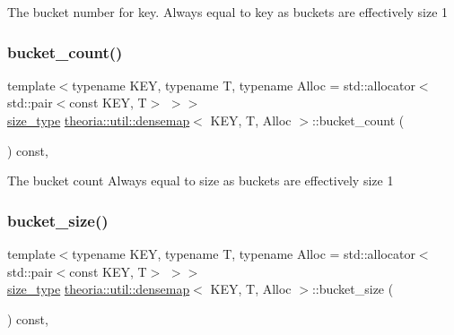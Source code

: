 The bucket number for key. Always equal to key as buckets are effectively size 1 \mbox{\label{classtheoria_1_1util_1_1densemap_acb06213b8d862b1295c79752a2329fd6}} 
\subsubsection{\texorpdfstring{bucket\+\_\+count()}{bucket\_count()}}
{\footnotesize\ttfamily template$<$typename K\+EY, typename T, typename Alloc = std\+::allocator$<$std\+::pair$<$const K\+E\+Y, T$>$ $>$$>$ \\
\hyperlink{classtheoria_1_1util_1_1densemap_a133075e61db44e086c734c8a32ca6ab2}{size\+\_\+type} \hyperlink{classtheoria_1_1util_1_1densemap}{theoria\+::util\+::densemap}$<$ K\+EY, T, Alloc $>$\+::bucket\+\_\+count (\begin{DoxyParamCaption}{ }\end{DoxyParamCaption}) const\hspace{0.3cm}{\ttfamily [inline]}, {\ttfamily [noexcept]}}

The bucket count Always equal to size as buckets are effectively size 1 \mbox{\label{classtheoria_1_1util_1_1densemap_a4e82874d3fe3d61d5e9a9f7405531316}} 
\subsubsection{\texorpdfstring{bucket\+\_\+size()}{bucket\_size()}}
{\footnotesize\ttfamily template$<$typename K\+EY, typename T, typename Alloc = std\+::allocator$<$std\+::pair$<$const K\+E\+Y, T$>$ $>$$>$ \\
\hyperlink{classtheoria_1_1util_1_1densemap_a133075e61db44e086c734c8a32ca6ab2}{size\+\_\+type} \hyperlink{classtheoria_1_1util_1_1densemap}{theoria\+::util\+::densemap}$<$ K\+EY, T, Alloc $>$\+::bucket\+\_\+size (\begin{DoxyParamCaption}{ }\end{DoxyParamCaption}) const\hspace{0.3cm}{\ttfamily [inline]}, {\ttfamily [noexcept]}}

